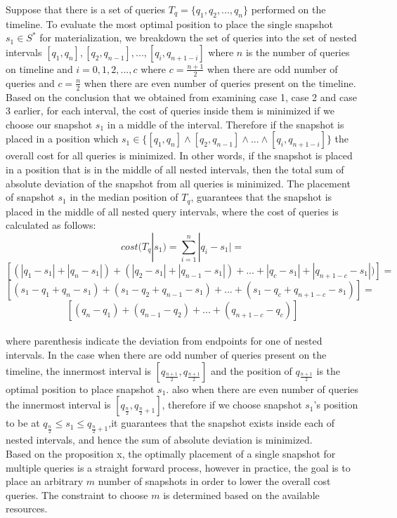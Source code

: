 Suppose that there is a set of queries $T_q=\{q_1,q_2,...,q_n\}$ performed on the timeline. To evaluate the most optimal position to place the single snapshot $s_1 \in S^*$ for materialization, we breakdown the set of queries into the set of nested intervals $[q_1,q_n],[q_2,q_{n-1}],...,[q_i,q_{n+1-i}]$ where $n$ is the number of queries on timeline and $i=0,1,2,...,c$ where $c=\frac{n+1}{2}$ when there are odd number of queries and $c=\frac{n}{2}$ when there are even number of queries present on the timeline.\\ 
Based on the conclusion that we obtained from examining case 1, case 2 and case 3 earlier, for each interval, the cost of queries inside them is minimized if we choose our snapshot $s_1$ in a middle of the interval. Therefore if the snapshot is placed in a position which $s_1\in \{ [q_1,q_n] \wedge [q_2,q_{n-1}] \wedge ... \wedge [q_i,q_{n+1-i}] \}$ the overall cost for all queries is minimized. In other words, if the snapshot is placed in a position that is in the middle of all nested intervals, then the total sum of absolute deviation of the snapshot from all queries is minimized. The placement of snapshot $s_1$ in the median position of $T_q$, guarantees that the snapshot is placed in the middle of all nested query intervals, where the cost of queries is calculated as follows:
$$cost(T_q|s_1)=\sum_{i=1}^n |q_i-s_1| = $$
$$[(|q_1-s_1|+|q_n-s_1|)+(|q_2-s_1|+|q_{n-1}-s_1|)+...+|q_c-s_1|+|q_{n+1-c}-s_1|)]=$$
$$[(s_1-q_1+q_n-s_1)+(s_1-q_2+q_{n-1}-s_1)+...+(s_1-q_c+q_{n+1-c}-s_1)]=$$
$$[(q_n-q_1)+(q_{n-1}-q_2)+...+(q_{n+1-c}-q_c)]$$\\
where parenthesis indicate the deviation from endpoints for one of nested intervals. In the case when there are odd number of queries present on the timeline, the innermost interval is $[q_{\frac{n+1}{2}},q_{\frac{n+1}{2}}]$ and the position of $q_{\frac{n+1}{2}}$ is the optimal position to place snapshot $s_1$. also when there are even number of queries the innermost interval is $[q_{\frac{n}{2}},q_{\frac{n}{2}+1}]$, therefore if we choose snapshot $s_1$'s position to be at $q_{\frac{n}{2}}\leq s_1\leq q_{\frac{n}{2}+1}$,it guarantees that the snapshot exists inside each of nested intervals, and hence the sum of absolute deviation is minimized. \\

Based on the proposition x, the optimally placement of a single snapshot for multiple queries is a straight forward process, however in practice, the goal is to place an arbitrary $m$ number of snapshots in order to lower the overall cost queries. The constraint to choose $m$ is determined based on the available resources.

